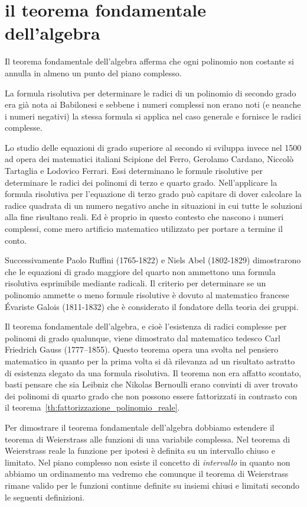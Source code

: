 \section{il teorema fondamentale dell'algebra}

Il teorema fondamentale dell'algebra afferma che ogni polinomio non costante 
si annulla in almeno un punto del piano complesso.

La formula risolutiva per determinare le radici di un polinomio di secondo grado 
era già nota ai Babilonesi e sebbene i numeri complessi non erano noti 
(e neanche i numeri negativi) la stessa formula si applica 
nel caso generale e fornisce le radici complesse.

Lo studio delle equazioni di grado superiore al secondo si sviluppa invece 
nel 1500 ad opera dei matematici italiani Scipione del Ferro, 
Gerolamo Cardano, Niccolò Tartaglia e Lodovico Ferrari.
Essi determinano le formule risolutive per determinare le radici 
dei polinomi di terzo e quarto grado. 
Nell'applicare la formula risolutiva per l'equazione di terzo grado 
può capitare di dover calcolare la radice quadrata di un numero negativo
anche in situazioni in cui tutte le soluzioni alla fine risultano reali.
Ed è proprio in questo contesto che nascono i numeri complessi, come 
mero artificio matematico utilizzato per portare a termine il conto.

Successivamente Paolo Ruffini (1765-1822) e Niels Abel (1802-1829) dimostrarono che le equazioni 
di grado maggiore del quarto non ammettono una formula risolutiva 
esprimibile mediante radicali. 
Il criterio per determinare se un polinomio
ammette o meno formule risolutive è dovuto al matematico francese Évariste Galois
(1811-1832) che è considerato il fondatore della teoria dei gruppi.

Il teorema fondamentale dell'algebra, e cioè l'esistenza di radici 
complesse per polinomi di grado qualunque, viene dimostrato dal 
matematico tedesco Carl Friedrich Gauss (1777--1855). 
Questo teorema opera una svolta nel pensiero matematico in quanto 
per la prima volta si dà rilevanza ad un risultato astratto di esistenza 
slegato da una formula risolutiva. 
Il teorema non era affatto scontato, basti pensare che sia Leibniz 
che Nikolas Bernoulli erano convinti di aver trovato dei polinomi 
di quarto grado che non possono essere fattorizzati in contrasto 
con il teorema~\ref{th:fattorizzazione_polinomio_reale}.

Per dimostrare il teorema fondamentale dell'algebra dobbiamo estendere il teorema 
di Weierstrass alle funzioni di una variabile complessa.
Nel teorema di Weierstrass reale la funzione per ipotesi è definita su un intervallo
chiuso e limitato. 
Nel piano complesso non esiste il concetto di \emph{intervallo} in quanto non abbiamo 
un ordinamento ma vedremo che comunque il teorema di Weierstrass rimane valido per 
le funzioni continue definite su insiemi chiusi e limitati secondo le seguenti definizioni.

